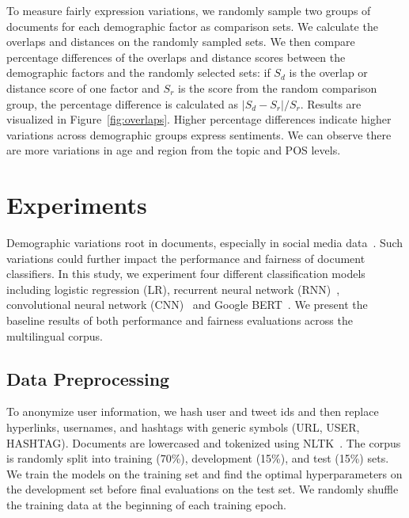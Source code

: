To measure fairly expression variations, we randomly sample two groups of documents for each demographic factor as comparison sets. 
We calculate the overlaps and distances on the randomly sampled sets. 
We then compare percentage differences of the overlaps and distance scores between the demographic factors and the randomly selected sets: if $S_d$ is the overlap or distance score of one factor and $S_r$ is the score from the random comparison group, the percentage difference is calculated as $|S_d - S_r|/S_r$.
Results are visualized in Figure~\ref{fig:overlaps}. 
Higher percentage differences indicate higher variations across demographic groups express sentiments.
We can observe there are more variations in age and region from the topic and POS levels.


\section{Experiments}

Demographic variations root in documents, especially in social media data~\cite{volkova2013exploring,hovy2015demographic,johannsen2015cross}.
Such variations could further impact the performance and fairness of document classifiers.
In this study, we experiment four different classification models including logistic regression (LR), recurrent neural network (RNN)~\cite{chung2014empirical}, convolutional neural network (CNN)~\cite{kim2014convolutional} and Google BERT~\cite{devlin2019bert}.
We present the baseline results of both performance and fairness evaluations across the multilingual corpus.

\subsection{Data Preprocessing}
To anonymize user information, we hash user and tweet ids and then replace hyperlinks, usernames, and hashtags with generic symbols (URL, USER, HASHTAG).
Documents are lowercased and tokenized using NLTK~\cite{bird2004nltk}. 
The corpus is randomly split into training (70\%), development (15\%), and test (15\%) sets. 
We train the models on the training set and find the optimal hyperparameters on the development set before final evaluations on the test set. 
We randomly shuffle the training data at the beginning of each training epoch.

